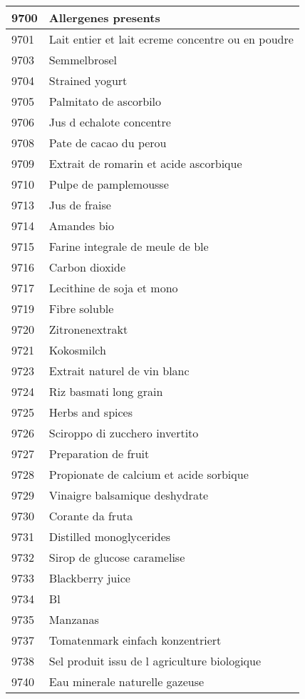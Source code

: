 \begin{longtable}{|l|l|}
9700 & Allergenes presents \\ \hline 
9701 & Lait entier et lait ecreme concentre ou en poudre \\ \hline 
9703 & Semmelbrosel \\ \hline 
9704 & Strained yogurt \\ \hline 
9705 & Palmitato de ascorbilo \\ \hline 
9706 & Jus d echalote concentre \\ \hline 
9708 & Pate de cacao du perou \\ \hline 
9709 & Extrait de romarin et acide ascorbique \\ \hline 
9710 & Pulpe de pamplemousse \\ \hline 
9713 & Jus de fraise \\ \hline 
9714 & Amandes bio \\ \hline 
9715 & Farine integrale de meule de ble \\ \hline 
9716 & Carbon dioxide \\ \hline 
9717 & Lecithine de soja et mono \\ \hline 
9719 & Fibre soluble \\ \hline 
9720 & Zitronenextrakt \\ \hline 
9721 & Kokosmilch \\ \hline 
9723 & Extrait naturel de vin blanc \\ \hline 
9724 & Riz basmati long grain \\ \hline 
9725 & Herbs and spices \\ \hline 
9726 & Sciroppo di zucchero invertito \\ \hline 
9727 & Preparation de fruit \\ \hline 
9728 & Propionate de calcium et acide sorbique \\ \hline 
9729 & Vinaigre balsamique deshydrate \\ \hline 
9730 & Corante da fruta \\ \hline 
9731 & Distilled monoglycerides \\ \hline 
9732 & Sirop de glucose caramelise \\ \hline 
9733 & Blackberry juice \\ \hline 
9734 & Bl \\ \hline 
9735 & Manzanas \\ \hline 
9737 & Tomatenmark einfach konzentriert \\ \hline 
9738 & Sel  produit issu de l agriculture biologique \\ \hline 
9740 & Eau minerale naturelle gazeuse \\ \hline 

\end{longtable}
